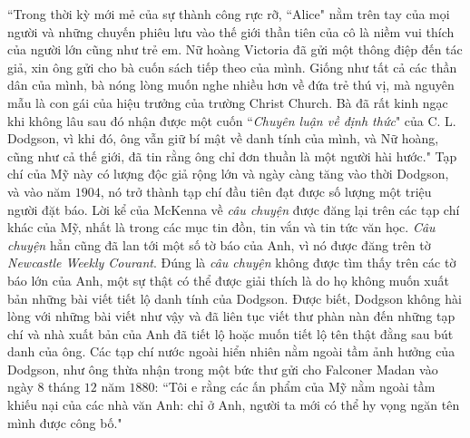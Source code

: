 \begin{multicols}{2}
	\vskip 0.1cm
	``Trong thời kỳ  mới mẻ của sự thành công rực rỡ, ``Alice" nằm  trên tay của mọi người và những chuyến phiêu lưu vào thế giới thần tiên của cô là niềm vui thích của  người lớn cũng như trẻ em. Nữ hoàng Victoria đã gửi một thông điệp đến tác giả, xin ông gửi cho bà cuốn sách tiếp theo của mình. Giống như tất cả các thần dân của mình, bà nóng lòng muốn nghe nhiều hơn về đứa trẻ thú vị, mà nguyên mẫu là con gái của hiệu trưởng của trường Christ Church. Bà đã rất kinh ngạc khi không lâu sau đó nhận được một cuốn ``\textit{Chuyên luận về định thức}" của C. L. Dodgson, vì khi đó, ông vẫn giữ bí mật về danh tính của mình, và Nữ hoàng, cũng như cả thế giới, đã tin rằng ông chỉ đơn thuần là một người hài hước."
	\vskip 0.1cm
	Tạp chí của Mỹ này có lượng độc giả rộng lớn và ngày càng tăng vào thời Dodgson, và vào năm $1904$, nó trở thành tạp chí đầu tiên đạt được số lượng một triệu người đặt báo. Lời kể của McKenna về \textit{câu chuyện} được đăng lại trên các tạp chí khác của Mỹ, nhất là trong các mục tin đồn, tin vắn và tin tức văn học. \textit{Câu chuyện} hẳn cũng đã lan tới một số tờ báo của Anh, vì nó được đăng trên tờ \textit{Newcastle Weekly Courant}. Đúng là \textit{câu chuyện} không được tìm thấy trên các tờ báo lớn của Anh, một sự thật có thể được giải thích là do họ không muốn xuất bản những bài viết tiết lộ danh tính của Dodgson. Được biết, Dodgson không hài lòng với những bài viết như vậy và đã liên tục viết thư phàn nàn đến những tạp chí và nhà xuất bản của Anh đã tiết lộ hoặc muốn tiết lộ tên thật đằng sau bút danh của ông. Các tạp chí nước ngoài hiển nhiên nằm ngoài tầm ảnh hưởng của Dodgson, như ông thừa nhận trong một bức thư gửi cho Falconer Madan vào ngày $8$ tháng $12$ năm $1880$: ``Tôi e rằng các ấn phẩm của Mỹ nằm ngoài tầm khiếu nại của các nhà văn Anh: chỉ ở Anh, người ta mới có thể hy vọng ngăn tên mình được công bố."
	\vskip 0.1cm

\end{multicols}
